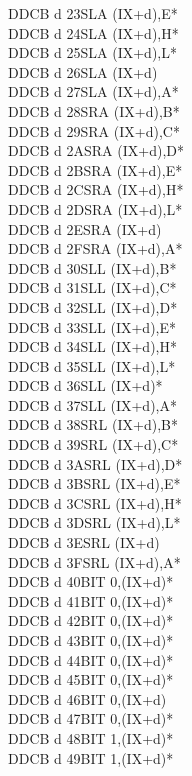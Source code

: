 \documentclass[oneside,a4paper]{book}
\begin{document}
\begin{multicols}{3}
{\begin{tabbing}
DDCB d 23\>SLA (IX+d),E*\\
DDCB d 24\>SLA (IX+d),H*\\
DDCB d 25\>SLA (IX+d),L*\\
DDCB d 26\>SLA (IX+d)\\
DDCB d 27\>SLA (IX+d),A*\\
DDCB d 28\>SRA (IX+d),B*\\
DDCB d 29\>SRA (IX+d),C*\\
DDCB d 2A\>SRA (IX+d),D*\\
DDCB d 2B\>SRA (IX+d),E*\\
DDCB d 2C\>SRA (IX+d),H*\\
DDCB d 2D\>SRA (IX+d),L*\\
DDCB d 2E\>SRA (IX+d)\\
DDCB d 2F\>SRA (IX+d),A*\\
DDCB d 30\>SLL (IX+d),B*\\
DDCB d 31\>SLL (IX+d),C*\\
DDCB d 32\>SLL (IX+d),D*\\
DDCB d 33\>SLL (IX+d),E*\\
DDCB d 34\>SLL (IX+d),H*\\
DDCB d 35\>SLL (IX+d),L*\\
DDCB d 36\>SLL (IX+d)*\\
DDCB d 37\>SLL (IX+d),A*\\
DDCB d 38\>SRL (IX+d),B*\\
DDCB d 39\>SRL (IX+d),C*\\
DDCB d 3A\>SRL (IX+d),D*\\
DDCB d 3B\>SRL (IX+d),E*\\
DDCB d 3C\>SRL (IX+d),H*\\
DDCB d 3D\>SRL (IX+d),L*\\
DDCB d 3E\>SRL (IX+d)\\
DDCB d 3F\>SRL (IX+d),A*\\
DDCB d 40\>BIT 0,(IX+d)*\\
DDCB d 41\>BIT 0,(IX+d)*\\
DDCB d 42\>BIT 0,(IX+d)*\\
DDCB d 43\>BIT 0,(IX+d)*\\
DDCB d 44\>BIT 0,(IX+d)*\\
DDCB d 45\>BIT 0,(IX+d)*\\
DDCB d 46\>BIT 0,(IX+d)\\
DDCB d 47\>BIT 0,(IX+d)*\\
DDCB d 48\>BIT 1,(IX+d)*\\
DDCB d 49\>BIT 1,(IX+d)*\\

\end{tabbing}}
\end{multicols}
\end{document}
